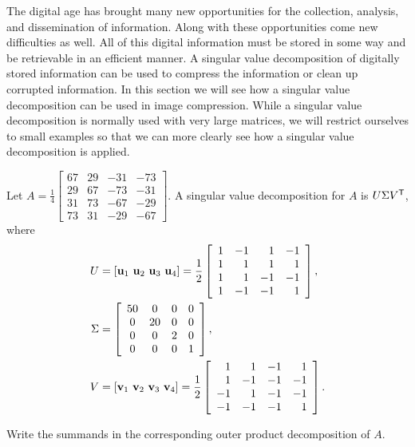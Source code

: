\label{sec:img_conpress}

The digital age has brought many new opportunities for the collection, analysis, and dissemination of information. Along with these opportunities come new difficulties as well. All of this digital information must be stored in some way and be retrievable in an efficient manner. A singular value decomposition of digitally stored information can be used to compress the information or clean up corrupted information. In this section we will see how a singular value decomposition can be used in image compression. While a singular value decomposition is normally used with very large matrices, we will restrict ourselves to small examples so that we can more clearly see how a singular value decomposition is applied.

\begin{pa} \label{pa:7_d_1} Let $A = \frac{1}{4}\left[ \begin{array}{ccrr} 67&29&-31&-73 \\ 29&67&-73&-31 \\ 31&73&-67&-29  \\ 73&31&-29&-67 \end{array} \right]$. A singular value decomposition for $A$ is $U \Sigma V^{\mathsf{T}}$, where
\begin{align*}
U &= [\mathbf{u}_1 \ \mathbf{u}_2 \ \mathbf{u}_3 \ \mathbf{u}_4] = \frac{1}{2} \left[ \begin{array}{crrr} 1&-1&1&-1\\1&1&1&1\\1&1&-1&-1\\1&-1&-1&1 \end{array} \right], \\
 \Sigma &=  \left[ \begin{array}{cccc} 50&0&0&0\\0&20&0&0\\0&0&2&0\\0&0&0&1 \end{array} \right], \\
 V &= [\mathbf{v}_1 \ \mathbf{v}_2 \ \mathbf{v}_3 \ \mathbf{v}_4] = \frac{1}{2} \left[ \begin{array}{rrrr} 1&1&-1&1\\1&-1&-1&-1\\-1&1&-1&-1\\-1&-1&-1&1 \end{array} \right].
 \end{align*}
	\be
	\item Write the summands in the corresponding outer product decomposition of $A$.
	

\end{pa}
